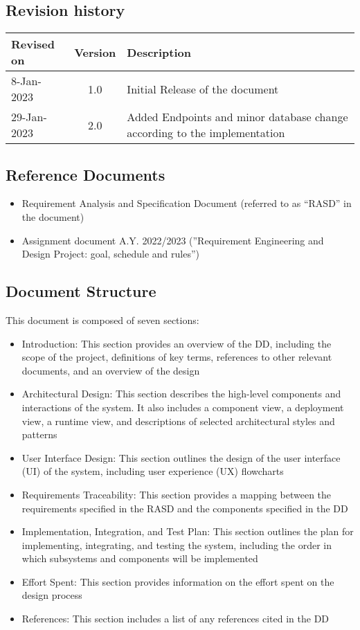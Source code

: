 \subsection{Revision history}
\begin{table}[H]
    \begin{tabularx}{\textwidth}{lcl}
        \toprule
        \textbf{Revised on} & Version & Description                                                               \\ \midrule
        8-Jan-2023          & 1.0     & Initial Release of the document                                           \\
        29-Jan-2023         & 2.0     & Added Endpoints and minor database change according to the implementation \\
        \bottomrule
    \end{tabularx}
\end{table}
\subsection{Reference Documents}
\begin{itemize}
    \item Requirement Analysis and Specification Document (referred to as “RASD” in the document)
    \item Assignment document A.Y. 2022/2023 (”Requirement Engineering and Design Project: goal, schedule
          and rules”)
\end{itemize}
\subsection{Document Structure}

This document is composed of seven sections:
\begin{itemize}
    \item Introduction: This section provides an overview of the DD, including the scope of the project, definitions of key terms, references to other relevant documents, and an overview of the design
    \item Architectural Design: This section describes the high-level components and interactions of the system. It also includes a component view, a deployment view, a runtime view, and descriptions of selected architectural styles and patterns
    \item User Interface Design: This section outlines the design of the user interface (UI) of the system, including user experience (UX) flowcharts
    \item Requirements Traceability: This section provides a mapping between the requirements specified in the RASD and the components specified in the DD
    \item Implementation, Integration, and Test Plan: This section outlines the plan for implementing, integrating, and testing the system, including the order in which subsystems and components will be implemented
    \item Effort Spent: This section provides information on the effort spent on the design process
    \item References: This section includes a list of any references cited in the DD
\end{itemize}
